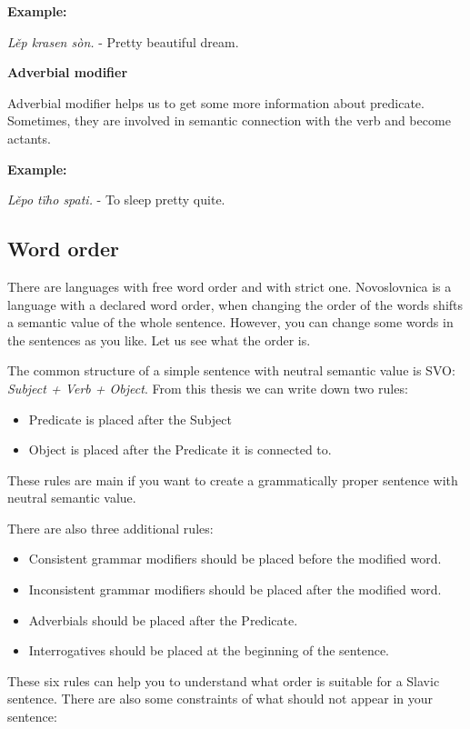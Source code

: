 \textbf{Example:}

\textit{Lěp krasen sòn.} - Pretty beautiful dream.

\textbf{Adverbial modifier}

Adverbial modifier helps us to get some more information about predicate. Sometimes, they are involved in semantic connection with the verb and become actants. 

\textbf{Example:}

\textit{Lěpo tïho spati.} - To sleep pretty quite.

\subsection{Word order}

There are languages with free word order and with strict one. Novoslovnica is a language with a declared word order, when changing the order of the words shifts a semantic value of the whole sentence. However, you can change some words in the sentences as you like. Let us see what the order is.

The common structure of a simple sentence with neutral semantic value is SVO: \textit{Subject + Verb + Object}. From this thesis we can write down two rules:

\begin{itemize}
	\item Predicate is placed after the Subject
	\item Object is placed after the Predicate it is connected to.
\end{itemize}

These rules are main if you want to create a grammatically proper sentence with neutral semantic value. 

There are also three additional rules:

\begin{itemize}
	\item Consistent grammar modifiers should be placed before the modified word.
	\item Inconsistent grammar modifiers should be placed after the modified word.
	\item Adverbials should be placed after the Predicate.
	\item Interrogatives should be placed at the beginning of the sentence.
\end{itemize}

These six rules can help you to understand what order is suitable for a Slavic sentence. There are also some constraints of what should not appear in your sentence:

